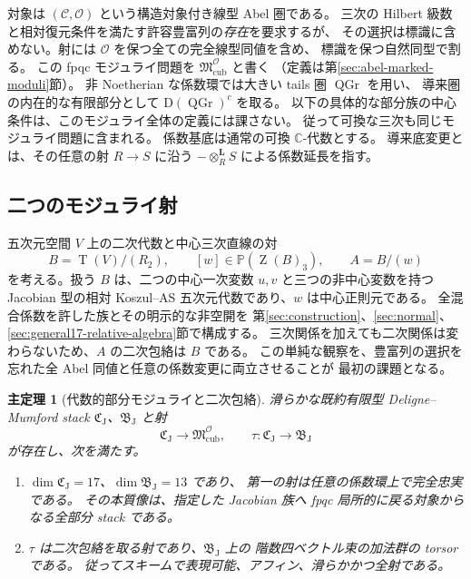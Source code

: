 \documentclass[11pt,a4paper]{ltjsarticle}
\numberwithin{equation}{section}
\newtheorem{maintheorem}{主定理}
\newcommand{\C}{\mathbb C}
\newcommand{\PP}{\mathbb P}
\newcommand{\Z}{\operatorname{Z}}
\newcommand{\Tens}{\operatorname{T}}
\begin{document}
対象は $(\mathcal C,\mathcal O)$ という構造対象付き線型 Abel 圏である。
三次の Hilbert 級数と相対復元条件を満たす許容豊富列の\emph{存在}を要求するが、
その選択は標識に含めない。射には $\mathcal O$ を保つ全ての完全線型同値を含め、
標識を保つ自然同型で割る。
この fpqc モジュライ問題を $\mathfrak M^{\mathcal O}_{\mathrm{cub}}$ と書く
（定義は第\ref{sec:abel-marked-moduli}節）。
非 Noetherian な係数環では大きい tails 圏 $\operatorname{QGr}$ を用い、
導来圏の内在的な有限部分として $\mathrm D(\operatorname{QGr})^c$ を取る。
以下の具体的な部分族の中心条件は、このモジュライ全体の定義には課さない。
従って可換な三次も同じモジュライ問題に含まれる。
係数基底は通常の可換 $\C$-代数とする。
導来底変更とは、その任意の射 $R\to S$ に沿う
$-\otimes_R^{\mathbf L}S$ による係数延長を指す。

\subsection{二つのモジュライ射}

五次元空間 $V$ 上の二次代数と中心三次直線の対
\begin{equation}\label{eq:data}
 B=\Tens(V)/(R_2),\qquad [w]\in\PP(\Z(B)_3),\qquad A=B/(w)
\end{equation}
を考える。扱う $B$ は、二つの中心一次変数 $u,v$ と三つの非中心変数を持つ
Jacobian 型の相対 Koszul--AS 五次元代数であり、$w$ は中心正則元である。
全混合係数を許した族とその明示的な非空開を
第\ref{sec:construction}、\ref{sec:normal}、\ref{sec:general17-relative-algebra}節で構成する。
三次関係を加えても二次関係は変わらないため、$A$ の二次包絡は $B$ である。
この単純な観察を、豊富列の選択を忘れた全 Abel 同値と任意の係数変更に両立させることが
最初の課題となる。

\begin{maintheorem}[代数的部分モジュライと二次包絡]\label{thm:intro-atlas}
滑らかな既約有限型 Deligne--Mumford stack
$\mathfrak C_{\mathrm J}$、$\mathfrak B_{\mathrm J}$ と射
\[
 \mathfrak C_{\mathrm J}\longrightarrow\mathfrak M^{\mathcal O}_{\mathrm{cub}},
 \qquad
 \tau:\mathfrak C_{\mathrm J}\longrightarrow\mathfrak B_{\mathrm J}
\]
が存在し、次を満たす。
\begin{enumerate}[label=\textup{(\roman*)}]
\item $\dim\mathfrak C_{\mathrm J}=17$、$\dim\mathfrak B_{\mathrm J}=13$ であり、
第一の射は任意の係数環上で完全忠実である。
その本質像は、指定した Jacobian 族へ fpqc 局所的に戻る対象からなる全部分 stack である。
\item $\tau$ は二次包絡を取る射であり、$\mathfrak B_{\mathrm J}$ 上の
階数四ベクトル束の加法群の torsor である。
従ってスキームで表現可能、アフィン、滑らかかつ全射である。
\end{enumerate}
\end{maintheorem}
\end{document}
